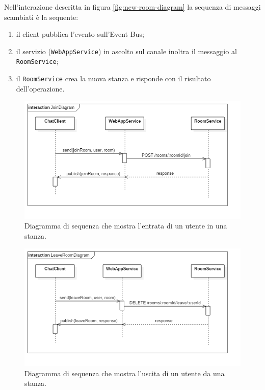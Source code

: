 \documentclass[a4paper]{article}
\begin{document}
Nell'interazione descritta in figura \ref{fig:new-room-diagram} la sequenza di messaggi scambiati è la sequente:
\begin{enumerate}[label=(\arabic*)]
%
    \item il client pubblica l'evento sull'Event Bus;
%
    \item il servizio (\texttt{WebAppService}) in ascolto sul canale inoltra il messaggio al \texttt{RoomService};
    
    \item il \texttt{RoomService} crea la nuova stanza e risponde con il risultato dell'operazione.
\end{enumerate}

\begin{figure}[H]
    \centering
    \includegraphics[width=\linewidth, height=\textheight, keepaspectratio]{res/JoinDiagram.png}
        \caption{Diagramma di sequenza che mostra l'entrata di un utente in una stanza.}
    \label{fig:enter-diagram}
\end{figure}

\begin{figure}[H]
    \centering
    \includegraphics[width=\linewidth, height=\textheight, keepaspectratio]{res/LeaveRoomDiagram.png}
        \caption{Diagramma di sequenza che mostra l'uscita di un utente da una stanza.}
    \label{fig:leave-diagram}
\end{figure}
\end{document}
